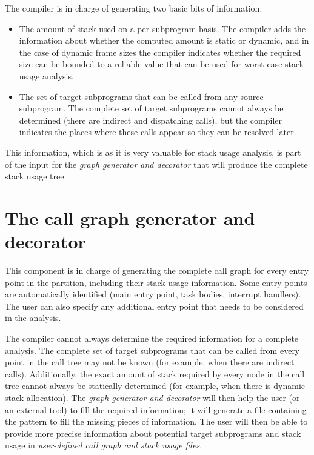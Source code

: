 The compiler is in charge of generating two basic bits of information:

\begin{itemize}

\item The amount of stack used on a per-subprogram basis. The
  compiler adds the information about whether the computed amount is
  static or dynamic, and in the case of dynamic frame sizes the
  compiler indicates whether the required size can be bounded to a
  reliable value that can be used for worst case stack usage analysis.

\item The set of target subprograms that can be called from any
  source subprogram. The complete set of target subprograms cannot
  always be determined (there are indirect and dispatching calls), but
  the compiler indicates the places where these calls appear so they
  can be resolved later.

\end{itemize}

This information, which is as it is very valuable for stack usage
analysis, is part of the input for the \emph{graph generator and
  decorator} that will produce the complete stack usage tree.

\section{The call graph generator and decorator}

This component is in charge of generating the complete call graph for
every entry point in the partition, including their stack usage
information. Some entry points are automatically identified (main
entry point, task bodies, interrupt handlers). The user can also
specify any additional entry point that needs to be considered in the
analysis.

The compiler cannot always determine the required information for a
complete analysis. The complete set of target subprograms that can be
called from every point in the call tree may not be known (for
example, when there are indirect calls). Additionally, the exact
amount of stack required by every node in the call tree cannot always
be statically determined (for example, when there is dynamic stack
allocation). The \emph{graph generator and decorator} will then help
the user (or an external tool) to fill the required information; it
will generate a file containing the pattern to fill the missing pieces
of information. The user will then be able to provide more precise
information about potential target subprograms and stack usage in
\emph{user-defined call graph and stack usage files}.


